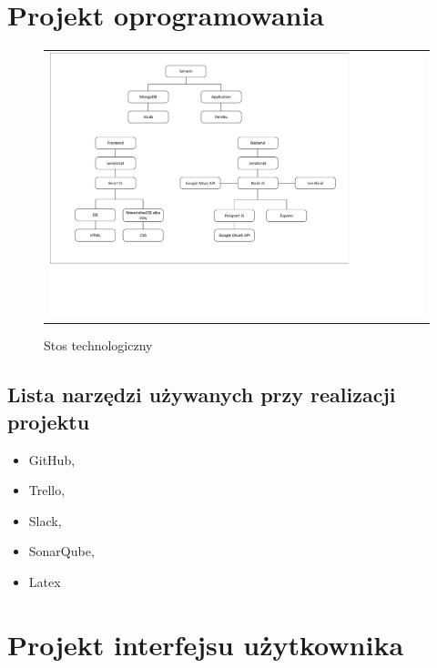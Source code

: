 \documentclass{sprawozdanie-agh}
\begin{document}
	\section{Projekt oprogramowania}
	
		\begin{figure}[H] 
			\centering
			\begin{tabular}{c}
				\includegraphics[width=.95\textwidth]{Stos_cropped} 
			\end{tabular} 
			\caption{Stos technologiczny}
		\end{figure}
	
		\subsection{Lista narzędzi używanych przy realizacji projektu}
		
			\begin{itemize}
				\item GitHub,
				\item Trello,
				\item Slack,
				\item SonarQube,
				\item Latex
				
			\end{itemize}

	\section{Projekt interfejsu użytkownika}
\end{document}
